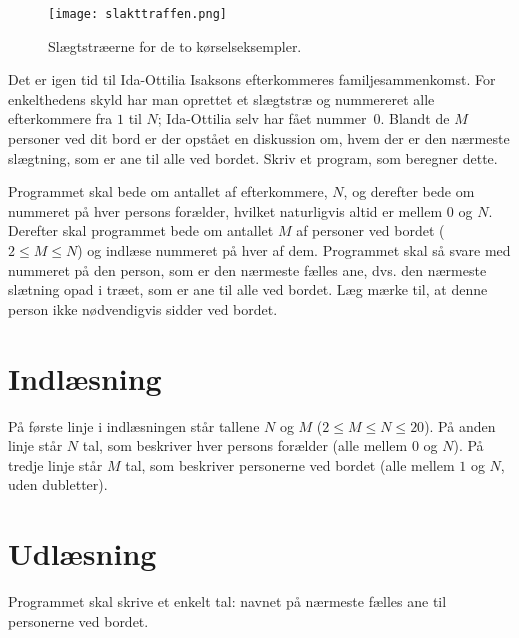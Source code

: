 \begin{figure}[h!]
  \centering
  \texttt{[image: slakttraffen.png]}
  \caption{Slægtstræerne for de to kørselseksempler.}
\end{figure}

Det er igen tid til Ida-Ottilia Isaksons efterkommeres familjesammenkomst. 
For enkelthedens skyld har man oprettet et slægtstræ og nummereret alle efterkommere fra $1$ til $N$; Ida-Ottilia selv har fået nummer~$0$.
Blandt de $M$ personer ved dit bord er der opstået en diskussion om, hvem der er den nærmeste slægtning, som er ane til alle ved bordet.
Skriv et program, som beregner dette.

Programmet skal bede om antallet af efterkommere, $N$, og derefter bede om nummeret på hver persons forælder, hvilket naturligvis altid er mellem $0$ og $N$.
Derefter skal programmet bede om antallet $M$ af personer ved bordet ($2 \le M \le N$) og indlæse nummeret på hver af dem.
Programmet skal så svare med nummeret på den person, som er den nærmeste fælles ane, dvs. den nærmeste slætning opad i træet, som er ane til alle ved bordet.
Læg mærke til, at denne person ikke nødvendigvis sidder ved bordet.

\section*{Indlæsning}
På første linje i indlæsningen står tallene $N$ og $M$ ($2 \le M \le N \le 20$).
På anden linje står $N$ tal, som beskriver hver persons forælder (alle mellem $0$ og $N$).
På tredje linje står $M$ tal, som beskriver personerne ved bordet (alle mellem $1$ og $N$, uden dubletter).

\section*{Udlæsning}
Programmet skal skrive et enkelt tal: navnet på nærmeste fælles ane til personerne ved bordet.
